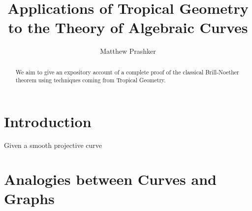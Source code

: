 \documentclass{article}
\title{Applications of Tropical Geometry to the Theory of Algebraic Curves}
\author{Matthew Prashker}
\begin{document}
\maketitle

\begin{abstract}
\noindent
We aim to give an expository account of a complete proof of the classical Brill-Noether theorem using techniques coming from Tropical Geometry.
\end{abstract}
\section{Introduction}
Given a smooth projective curve 
\section{Analogies between Curves and Graphs}
\end{document}
